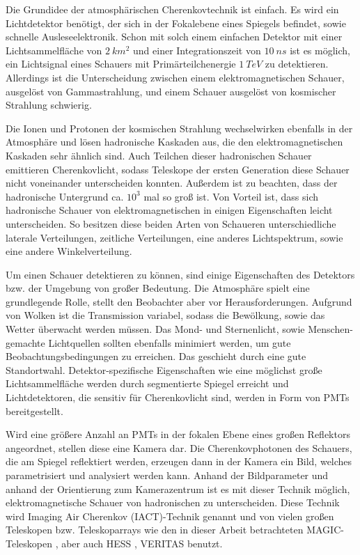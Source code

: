 Die Grundidee der atmosphärischen Cherenkovtechnik ist einfach.
Es wird ein Lichtdetektor benötigt, der sich in der Fokalebene eines Spiegels befindet, sowie schnelle Ausleseelektronik.
Schon mit solch einem einfachen Detektor mit einer Lichtsammelfläche von $\SI{2}{km^2}$ und einer Integrationszeit von $\SI{10}{ns}$ ist es möglich, ein Lichtsignal eines Schauers mit Primärteilchenergie $\SI{1}{TeV}$ zu detektieren.
Allerdings ist die Unterscheidung zwischen einem elektromagnetischen Schauer, ausgelöst von Gammastrahlung, und einem Schauer ausgelöst von kosmischer Strahlung schwierig.\cite{Weekes}

Die Ionen und Protonen der kosmischen Strahlung wechselwirken ebenfalls in der Atmosphäre und lösen hadronische Kaskaden aus, die den elektromagnetischen Kaskaden sehr ähnlich sind.
Auch Teilchen dieser hadronischen Schauer emittieren Cherenkovlicht, sodass Teleskope der ersten Generation diese Schauer nicht voneinander unterscheiden konnten.
Außerdem ist zu beachten, dass der hadronische Untergrund ca. $10^3$ mal so groß ist.
Von Vorteil ist, dass sich hadronische Schauer von elektromagnetischen in einigen Eigenschaften leicht unterscheiden.
So besitzen diese beiden Arten von Schaueren unterschiedliche laterale Verteilungen, zeitliche Verteilungen, eine anderes Lichtspektrum, sowie eine andere Winkelverteilung.\cite{Weekes}

Um einen Schauer detektieren zu können, sind einige Eigenschaften des Detektors bzw. der Umgebung von großer Bedeutung.
Die Atmosphäre spielt eine grundlegende Rolle, stellt den Beobachter aber vor Herausforderungen. 
Aufgrund von Wolken ist die Transmission variabel, sodass die Bewölkung, sowie das Wetter überwacht werden müssen.
Das Mond- und Sternenlicht, sowie Menschen-gemachte Lichtquellen sollten ebenfalls minimiert werden, um gute Beobachtungsbedingungen zu erreichen. 
Das geschieht durch eine gute Standortwahl.
Detektor-spezifische Eigenschaften wie eine möglichst große Lichtsammelfläche werden durch segmentierte Spiegel erreicht und Lichtdetektoren, die sensitiv für Cherenkovlicht sind, werden in Form von PMTs bereitgestellt.\cite{Weekes}

Wird eine größere Anzahl an PMTs in der fokalen Ebene eines großen Reflektors angeordnet, stellen diese eine Kamera dar.
Die Cherenkovphotonen des Schauers, die am Spiegel reflektiert werden, erzeugen dann in der Kamera ein Bild, welches parametrisiert und analysiert werden kann.
Anhand der Bildparameter und anhand der Orientierung zum Kamerazentrum ist es mit dieser Technik möglich, elektromagnetische Schauer von hadronischen zu unterscheiden.
Diese Technik wird Imaging Air Cherenkov (IACT)-Technik genannt und von vielen großen Teleskopen bzw. Teleskoparrays wie den in dieser Arbeit betrachteten MAGIC-Teleskopen \cite{MAGIC_Telescopes}, aber auch HESS \cite{HESS}, VERITAS \cite{VERITAS} benutzt.\cite{Weekes}


